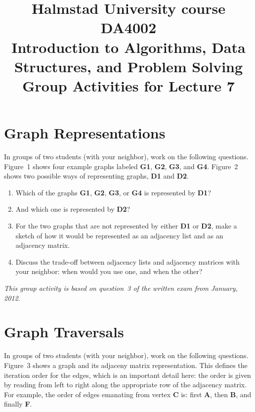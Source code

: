 \documentclass[a4paper]{article}
\begin{document}
\title{
  {\small
    Halmstad University course DA4002\\
    Introduction to Algorithms, Data Structures, and Problem Solving\\
  }
  Group Activities for Lecture 7
}
\maketitle



\section{Graph Representations}

In groups of two students (with your neighbor), work on the following questions.
Figure~1 shows four example graphs labeled \textbf{G1}, \textbf{G2}, \textbf{G3}, and \textbf{G4}.
Figure~2 shows two possible ways of representing graphs, \textbf{D1} and \textbf{D2}.

\begin{enumerate}
\item
  Which of the graphs \textbf{G1}, \textbf{G2}, \textbf{G3}, or \textbf{G4} is represented by \textbf{D1}?
\item
  And which one is represented by \textbf{D2}?
\item
  For the two graphs that are not represented by either \textbf{D1} or \textbf{D2}, make a sketch of how it would be represented as an adjacency list and as an adjacency matrix.
\item
  Discuss the trade-off between adjacency lists and adjacency matrices with your neighbor:
  when would you use one, and when the other?
\end{enumerate}

\noindent
\emph{This group activity is based on question~3 of the written exam from January, 2012.}



\section{Graph Traversals}

In groups of two students (with your neighbor), work on the following questions.
Figure~3 shows a graph and its adjaceny matrix representation.
This defines the iteration order for the edges, which is an important detail here:
the order is given by reading from left to right along the appropriate row of the adjacency matrix.
For example, the order of edges emanating from vertex \textbf{C} is: first \textbf{A}, then \textbf{B}, and finally \textbf{F}.
\end{document}

